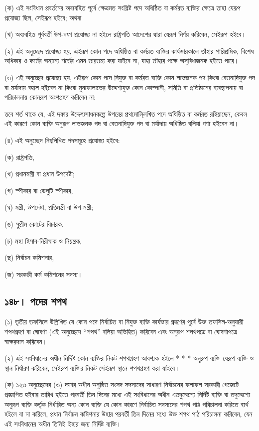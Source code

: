 \documentclass[11pt]{article}
\begin{document}
(ক) এই সংবিধান প্রবর্তনের অব্যবহিত পূর্বে ক্ষেত্রমত সংশ্লিষ্ট পদে অধিষ্ঠিত বা
    কর্মরত ব্যক্তির ক্ষেত্রে তাহা যেরূপ প্রযোজ্য ছিল, সেইরূপ হইবে; অথবা

(খ) অব্যবহিত পূর্ববর্তী উপ-দফা প্রযোজ্য না হইলে রাষ্ট্রপতি আদেশের দ্বারা যেরূপ
    নির্ণয় করিবেন, সেইরূপ হইবে।

(২) এই অনুচ্ছেদ প্রযোজ্য হয়, এইরূপ কোন পদে অধিষ্ঠিত বা কর্মরত ব্যক্তির
    কার্যভারকালে তাঁহার পারিশ্রমিক, বিশেষ অধিকার ও কর্মের অন্যান্য শর্তের এমন
    তারতম্য করা যাইবে না, যাহা তাঁহার পক্ষে অসুবিধাজনক হইতে পারে।

(৩) এই অনুচ্ছেদ প্রযোজ্য হয়, এইরূপ কোন পদে নিযুক্ত বা কর্মরত ব্যক্তি কোন লাভজনক
    পদ কিংবা বেতনাদিযুক্ত পদ বা মর্যাদায় বহাল হইবেন না কিংবা মুনাফালাভের
    উদ্দেশ্যযুক্ত কোন কোম্পানী, সমিতি বা প্রতিষ্ঠানের ব্যবস্থাপনায় বা পরিচালনায়
    কোনরূপ অংশগ্রহণ করিবেন না:

তবে শর্ত থাকে যে, এই দফার উদ্দেশ্যসাধনকল্পে উপরের প্রথমোলি্লখিত পদে অধিষ্ঠিত
বা কর্মরত রহিয়াছেন, কেবল এই কারণে কোন ব্যক্তি অনুরূপ লাভজনক পদ বা
বেতনাদিযুক্ত পদ বা মর্যাদায় অধিষ্ঠিত বলিয়া গণ্য হইবেন না।

(৪) এই অনুচ্ছেদ নিম্নলিখিত পদসমূহে প্রযোজ্য হইবে:

(ক) রাষ্ট্রপতি,

(খ) প্রধানমন্ত্রী বা প্রধান উপদেষ্টা;

(গ) স্পীকার বা ডেপুটি স্পীকার,

(ঘ) মন্ত্রী, উপদেষ্টা, প্রতিমন্ত্রী বা উপ-মন্ত্রী;

(ঙ) সুপ্রীম কোর্টের বিচারক,

(চ) মহা হিসাব-নিরীক্ষক ও নিয়ন্ত্রক,

(ছ) নির্বাচন কমিশনার,

(জ) সরকারী কর্ম কমিশনের সদস্য।
\subsection{১৪৮। পদের শপথ}
\label{sec:org9c60d77}
(১) তৃতীয় তফসিলে উল্লিখিত যে কোন পদে নির্বাচিত বা নিযুক্ত ব্যক্তি কার্যভার
    গ্রহণের পূর্বে উক্ত তফসিল-অনুযায়ী শপথগ্রহণ বা ঘোষণা (এই অনুচ্ছেদে “শপথ” বলিয়া
    অভিহিত) করিবেন এবং অনুরূপ শপথপত্রে বা ঘোষণাপত্রে স্বাক্ষরদান করিবেন।

(২) এই সংবিধানের অধীন নির্দিষ্ট কোন ব্যক্তির নিকট শপথগ্রহণ আবশ্যক হইলে * * *
    অনুরূপ ব্যক্তি যেরূপ ব্যক্তি ও স্থান নির্ধারণ করিবেন, সেইরূপ ব্যক্তির নিকট সেইরূপ
    স্থানে শপথগ্রহণ করা যাইবে।

(ক) ১২৩ অনুচ্ছেদের (৩) দফার অধীন অনুষ্ঠিত সংসদ সদস্যদের সাধারণ নির্বাচনের
    ফলাফল সরকারী গেজেটে প্রজ্ঞাপিত হইবার তারিখ হইতে পরবর্তী তিন দিনের মধ্যে এই
    সংবিধানের অধীন এতদুদ্দেশ্যে নির্দিষ্ট ব্যক্তি বা তদুদ্দেশ্যে অনুরূপ ব্যক্তি কর্তৃক
    নির্ধারিত অন্য কোন ব্যক্তি যে কোন কারণে নির্বাচিত সদস্যদের শপথ পাঠ পরিচালনা
    করিতে ব্যর্থ হইলে বা না করিলে, প্রধান নির্বাচন কমিশনার উহার পরবর্তী তিন
    দিনের মধ্যে উক্ত শপথ পাঠ পরিচালনা করিবেন, যেন এই সংবিধানের অধীন তিনিই
    ইহার জন্য নির্দিষ্ট ব্যক্তি।
\end{document}
